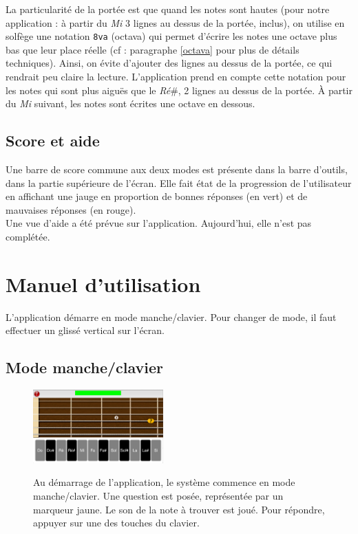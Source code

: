 \documentclass{scrreprt}
\begin{document}
La particularité de la portée est que quand les notes sont hautes (pour notre application : à partir du \textit{Mi} 3 lignes au dessus de la portée, inclus), on utilise en solfège une notation \texttt{8va} (octava) qui permet d'écrire les notes une octave plus bas que leur place réelle (cf : paragraphe \ref{octava} pour plus de détails techniques). 
Ainsi, on évite d'ajouter des lignes au dessus de la portée, ce qui rendrait peu claire la lecture.
L'application prend en compte cette notation pour les notes qui sont plus aiguës que le \textit{Ré}\#, 2 lignes au dessus de la portée. À partir du \textit{Mi} suivant, les notes sont écrites une octave en dessous.\\

\subsection{Score et aide}


Une barre de score commune aux deux modes est présente dans la barre d'outils, dans la partie supérieure de l'écran. 
Elle fait état de la progression de l’utilisateur en affichant une jauge en proportion de bonnes réponses (en vert) et de mauvaises réponses (en rouge).\\
Une vue d'aide a été prévue sur l'application. Aujourd'hui, elle n'est pas complétée.


\section{Manuel d'utilisation}


L'application démarre en mode manche/clavier.
Pour changer de mode, il faut effectuer un glissé vertical sur l'écran.

\subsection{Mode manche/clavier}

\begin{figure}[!ht]
  \begin{minipage}{6cm}
      \includegraphics[width=5cm]{images/clavier_first_question.png}
  \end{minipage}\hfill
  \begin{minipage}{10cm}
  {Au démarrage de l'application, le système commence en mode manche/clavier. Une question est posée, représentée par un marqueur jaune. Le son de la note à trouver est joué.
	 Pour répondre, appuyer sur une des touches du clavier.}
   \end{minipage}
\end{figure}
\end{document}

